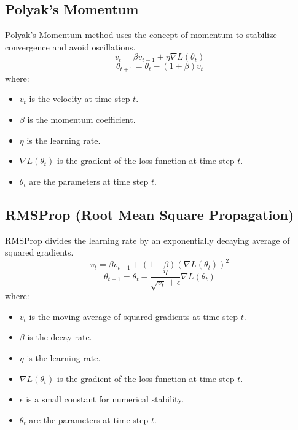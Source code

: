 \documentclass{article}
\begin{document}
\subsection{Polyak's Momentum}
Polyak's Momentum method uses the concept of momentum to stabilize convergence and avoid oscillations.
\begin{equation}
v_t = \beta v_{t-1} + \eta \nabla L(\theta_t)
\end{equation}
\begin{equation}
\theta_{t+1} = \theta_t - (1 + \beta) v_t
\end{equation}
where:
\begin{itemize}
    \item $v_t$ is the velocity at time step $t$.
    \item $\beta$ is the momentum coefficient.
    \item $\eta$ is the learning rate.
    \item $\nabla L(\theta_t)$ is the gradient of the loss function at time step $t$.
    \item $\theta_t$ are the parameters at time step $t$.
\end{itemize}

\subsection{RMSProp (Root Mean Square Propagation)}
RMSProp divides the learning rate by an exponentially decaying average of squared gradients.
\begin{equation}
v_t = \beta v_{t-1} + (1 - \beta) (\nabla L(\theta_t))^2
\end{equation}
\begin{equation}
\theta_{t+1} = \theta_t - \frac{\eta}{\sqrt{v_t} + \epsilon} \nabla L(\theta_t)
\end{equation}
where:
\begin{itemize}
    \item $v_t$ is the moving average of squared gradients at time step $t$.
    \item $\beta$ is the decay rate.
    \item $\eta$ is the learning rate.
    \item $\nabla L(\theta_t)$ is the gradient of the loss function at time step $t$.
    \item $\epsilon$ is a small constant for numerical stability.
    \item $\theta_t$ are the parameters at time step $t$.
\end{itemize}
\end{document}
